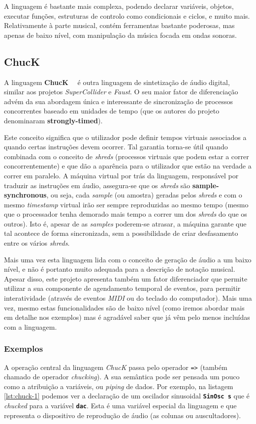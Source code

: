 A linguagem é bastante mais complexa, podendo declarar variáveis, objetos, executar funções, estruturas de controlo como condicionais e ciclos, e muito mais. Relativamente à parte musical, contém ferramentas bastante poderosas, mas apenas de baixo nível, com manipulação da música focada em ondas sonoras.

\subsection{ChucK}
A linguagem \textbf{ChucK}~\cite{doi:Chuck}~\cite{wang2003chuck} é outra linguagem de sintetização de áudio digital, similar aos projetos \textit{SuperCollider} e \textit{Faust}. O seu maior fator de diferenciação advém da sua abordagem única e interessante de sincronização de processos concorrentes baseado em unidades de tempo (que os autores do projeto denominaram \textbf{strongly-timed}).

Este conceito significa que o utilizador pode definir tempos virtuais associados a quando certas instruções devem ocorrer. Tal garantia torna-se útil quando combinada com o conceito de \textit{shreds} (processos virtuais que podem estar a correr concorrentemente) e que dão a aparência para o utilizador que estão na verdade a correr em paralelo. A máquina virtual por trás da linguagem, responsável por traduzir as instruções em áudio, assegura-se que os \textit{shreds} são \textbf{sample-synchronous}, ou seja, cada \textit{sample} (ou amostra) geradas pelos \textit{shreds} e com o mesmo \textit{timestamp} virtual irão ser sempre reproduzidas ao mesmo tempo (mesmo que o processador tenha demorado mais tempo a correr um dos \textit{shreds} do que os outros). Isto é, apesar de as \textit{samples} poderem-se atrasar, a máquina garante que tal acontece de forma sincronizada, sem a possibilidade de criar desfasamento entre os vários \textit{shreds}.

Mais uma vez esta linguagem lida com o conceito de geração de áudio a um baixo nível, e não é portanto muito adequada para a descrição de notação musical. Apesar disso, este projeto apresenta também um fator diferenciador que permite utilizar a sua componente de agendamento temporal de eventos, para permitir interatividade (através de eventos \textit{MIDI} ou do teclado do computador). Mais uma vez, mesmo estas funcionalidades são de baixo nível (como iremos abordar mais em detalhe nos exemplos) mas é agradável saber que já vêm pelo menos incluídas com a linguagem.

\subsubsection{Exemplos}
A operação central da linguagem \textit{ChucK} passa pelo operador \texttt{=>} (também chamado de operador \textit{chucking}). A sua semântica pode ser pensada um pouco como a atribuição a variáveis, ou \textit{piping} de dados. Por exemplo, na listagem \ref{lst:chuck-1} podemos ver a declaração de um oscilador sinusoidal \textbf{\texttt{SinOsc s}} que é \textit{chucked} para a variável \textbf{\texttt{dac}}. Esta é uma variável especial da linguagem e que representa o dispositivo de reprodução de áudio (as colunas ou auscultadores).


